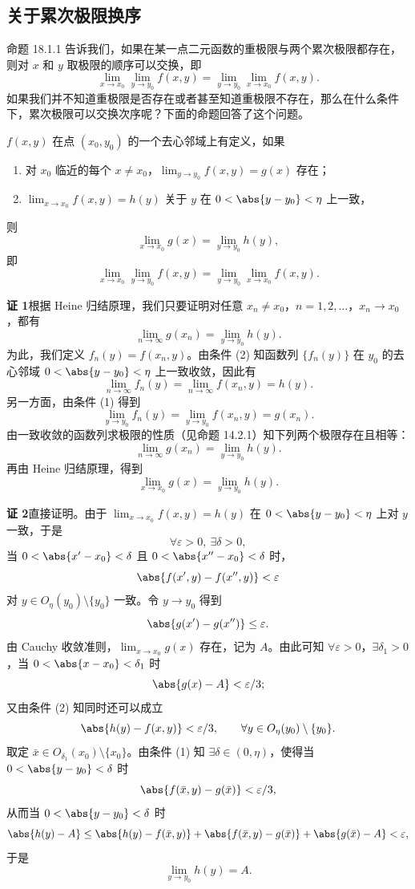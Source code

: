 \subsection{关于累次极限换序}

命题 18.1.1 告诉我们，如果在某一点二元函数的重极限与两个累次极限都存在，则对 $x$ 和 $y$ 取极限的顺序可以交换，即
\[
  \lim_{x\to x_0}\lim_{y\to y_0}f(x,y)
  =\lim_{y\to y_0}\lim_{x\to x_0}f(x,y).
\]
如果我们并不知道重极限是否存在或者甚至知道重极限不存在，那么在什么条件下，累次极限可以交换次序呢？下面的命题回答了这个问题。

\begin{xproposition}[18.1.2]
$f(x,y)$ 在点 $(x_0,y_0)$ 的一个去心邻域上有定义，如果
\begin{enumerate}[label=(\arabic*)]
  \item 对 $x_0$ 临近的每个 $x\ne x_0$，$\displaystyle\lim_{y\to y_0}f(x,y)=g(x)$ 存在；
  \item $\displaystyle\lim_{x\to x_0}f(x,y)=h(y)$ 关于 $y$ 在 $0<\abs{y-y_0}<\eta$ 上一致，
\end{enumerate}
则
\[
  \lim_{x\to x_0}g(x)=\lim_{y\to y_0}h(y),
\]
即
\[
  \lim_{x\to x_0}\lim_{y\to y_0}f(x,y)
  =\lim_{y\to y_0}\lim_{x\to x_0}f(x,y).
\]
\end{xproposition}

\begin{xproof}
\textbf{证 1}\quad 根据 Heine 归结原理，我们只要证明对任意 $x_n\ne x_0$，$n=1,2,\ldots$，$x_n\to x_0$，都有
\[
  \lim_{n\to\infty}g(x_n)=\lim_{y\to y_0}h(y).
\]
为此，我们定义 $f_n(y)=f(x_n,y)$。由条件 (2) 知函数列 $\{f_n(y)\}$ 在 $y_0$ 的去心邻域 $0<\abs{y-y_0}<\eta$ 上一致收敛，因此有
\[
  \lim_{n\to\infty}f_n(y)
  =\lim_{n\to\infty}f(x_n,y)=h(y).
\]
另一方面，由条件 (1) 得到
\[
  \lim_{y\to y_0}f_n(y)
  =\lim_{y\to y_0}f(x_n,y)=g(x_n).
\]
由一致收敛的函数列求极限的性质（见命题 14.2.1）知下列两个极限存在且相等：
\[
  \lim_{n\to\infty}g(x_n)=\lim_{y\to y_0}h(y).
\]
再由 Heine 归结原理，得到
\[
  \lim_{x\to x_0}g(x)=\lim_{y\to y_0}h(y).
\]

\textbf{证 2}\quad 直接证明。由于 $\displaystyle\lim_{x\to x_0}f(x,y)=h(y)$ 在 $0<\abs{y-y_0}<\eta$ 上对 $y$ 一致，于是
\[
  \forall\varepsilon>0,\ \exists\delta>0,
\]
当 $0<\abs{x'-x_0}<\delta$ 且 $0<\abs{x''-x_0}<\delta$ 时，
\[
  \abs{f(x',y)-f(x'',y)}<\varepsilon
\]
对 $y\in O_\eta(y_0)\setminus\{y_0\}$ 一致。令 $y\to y_0$ 得到
\[
  \abs{g(x')-g(x'')}\le\varepsilon.
\]
由 Cauchy 收敛准则，$\displaystyle\lim_{x\to x_0}g(x)$ 存在，记为 $A$。由此可知 $\forall\varepsilon>0$，$\exists\delta_1>0$，当 $0<\abs{x-x_0}<\delta_1$ 时
\[
  \abs{g(x)-A}<\varepsilon/3;
\]
又由条件 (2) 知同时还可以成立
\[
  \abs{h(y)-f(x,y)}<\varepsilon/3,
  \qquad \forall y\in O_\eta(y_0)\setminus\{y_0\}.
\]
取定 $\bar x\in O_{\delta_1}(x_0)\setminus\{x_0\}$。由条件 (1) 知 $\exists\delta\in(0,\eta)$，使得当 $0<\abs{y-y_0}<\delta$ 时
\[
  \abs{f(\bar x,y)-g(\bar x)}<\varepsilon/3,
\]
从而当 $0<\abs{y-y_0}<\delta$ 时
\[
  \abs{h(y)-A}
  \le \abs{h(y)-f(\bar x,y)}
  +\abs{f(\bar x,y)-g(\bar x)}
  +\abs{g(\bar x)-A}<\varepsilon,
\]
于是
\[
  \lim_{y\to y_0}h(y)=A.
\]
\end{xproof}

